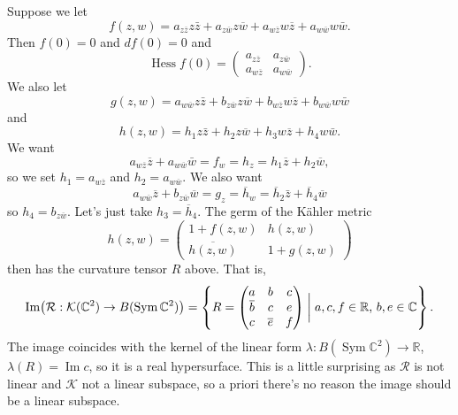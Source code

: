 \documentclass[11pt]{amsart}
\theoremstyle{definition}
\newcommand{\kk}[1]{\mathbb{#1}}
\newcommand{\cc}[1]{\mathcal{#1}}
\def\ov#1{\overline{#1}}
\DeclareMathOperator{\im}{Im}
\DeclareMathOperator{\Sym}{Sym}
\begin{document}
Suppose we let
$$
f(z,w)
= a_{z \ov z} z \bar z
+ a_{z \ov w} z \ov w
+ a_{w \ov z} w \ov z
+ a_{w \ov w} w \bar w.
$$
Then $f(0) = 0$ and $df(0) = 0$ and
$$
\operatorname{Hess} f(0)
= \begin{pmatrix}
a_{z \ov z} & a_{z \ov w}
\\
a_{w \ov z} & a_{w \ov w}
\end{pmatrix}.
$$
We also let
$$
g(z,w)
= a_{w \ov w} z \bar z
+ b_{z \ov w} z \ov w
+ b_{w \ov z} w \ov z
+ b_{w \ov w} w \bar w
$$
and
$$
h(z,w)
= h_1 z \bar z
+ h_2 z \ov w
+ h_3 w \ov z
+ h_4 w \bar w.
$$
We want
$$
a_{w \ov z} \ov z + a_{w \ov w} \bar w
= f_w = h_z
= h_1 \ov z + h_2 \ov w,
$$
so we set $h_1 = a_{w \ov z}$ and $h_2 = a_{w \ov w}$.
We also want
$$
a_{w \ov w} \ov z + b_{z \ov w} \ov w
= g_z = \ov h_w
= \ov h_2 \bar z + \ov h_4 \ov w
$$
so $h_4 = b_{z \ov w}$.
Let's just take $h_3 = \ov h_4$.
The germ of the K\"ahler metric
$$
h(z,w)
= \begin{pmatrix}
1 + f(z,w) & h(z,w)
\\
\ov{h(z,w)} & 1 + g(z,w)
\end{pmatrix}
$$
then has the curvature tensor $R$ above. That is,
$$
\im\bigl(
\cc R : \cc K(\kk C^2) \to B(\Sym \kk C^2)
\bigr)
= \left\{
R =
\begin{pmatrix}
a & b & c
\\
\ov b & c & e
\\
c & \ov e & f
\end{pmatrix}
\biggm|
\text{$a, c, f \in \kk R$, $b, e \in \kk C$}
\right\}.
$$
The image coincides with the kernel of the linear form
$\lambda : B(\Sym \kk C^2) \to \kk R$, $\lambda(R) = \im c$, so it is a real
hypersurface.
This is a little surprising as $\cc R$ is not linear and $\cc K$ not a linear
subspace, so a priori there's no reason the image should be a linear subspace.
\end{document}
